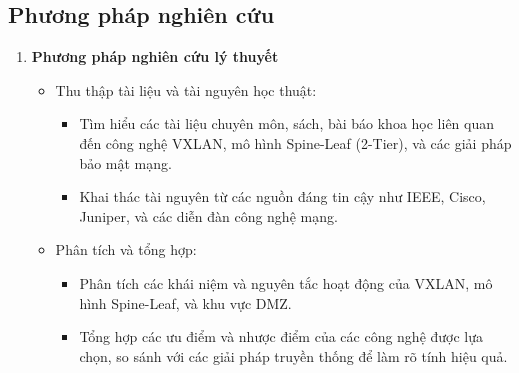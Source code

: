 \documentclass[13pt]{article}
\begin{document}
    \subsection{Phương pháp nghiên cứu}
    \begin{enumerate}
        \item \textbf{Phương pháp nghiên cứu lý thuyết}
        \begin{itemize}
            \item Thu thập tài liệu và tài nguyên học thuật:
            \begin{itemize}
                \item Tìm hiểu các tài liệu chuyên môn, sách, bài báo khoa học liên quan đến công nghệ VXLAN, mô hình Spine-Leaf (2-Tier), và các giải pháp bảo mật mạng.
                \item Khai thác tài nguyên từ các nguồn đáng tin cậy như IEEE, Cisco, Juniper, và các diễn đàn công nghệ mạng.
            \end{itemize}
            \item Phân tích và tổng hợp:
            \begin{itemize}
                \item Phân tích các khái niệm và nguyên tắc hoạt động của VXLAN, mô hình Spine-Leaf, và khu vực DMZ.
                \item Tổng hợp các ưu điểm và nhược điểm của các công nghệ được lựa chọn, so sánh với các giải pháp truyền thống để làm rõ tính hiệu quả.
            \end{itemize}
        \end{itemize}


\end{enumerate}
\end{document}
